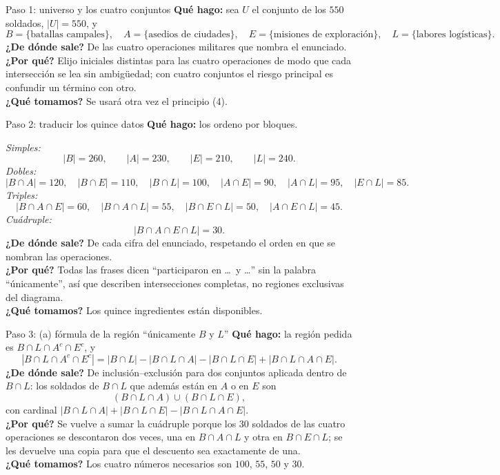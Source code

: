 \documentclass[11pt]{article}
\begin{document}
\begin{sol}

\begin{paso}{Paso 1: universo y los cuatro conjuntos}
\textbf{Qu\'e hago:} sea $U$ el conjunto de los $550$ soldados, $|U| = 550$, y
\[
B=\{\text{batallas campales}\},\quad
A=\{\text{asedios de ciudades}\},\quad
E=\{\text{misiones de exploraci\'on}\},\quad
L=\{\text{labores log\'isticas}\}.
\]
\textbf{¿De d\'onde sale?} De las cuatro operaciones militares que nombra el enunciado.\\
\textbf{¿Por qu\'e?} Elijo iniciales distintas para las cuatro operaciones de modo que cada intersecci\'on se lea sin ambig\"uedad; con cuatro conjuntos el riesgo principal es confundir un t\'ermino con otro.\\
\textbf{¿Qu\'e tomamos?} Se usar\'a otra vez el principio (4).
\end{paso}

\begin{paso}{Paso 2: traducir los quince datos}
\textbf{Qu\'e hago:} los ordeno por bloques.

\emph{Simples:}
\[
|B| = 260,\qquad |A| = 230,\qquad |E| = 210,\qquad |L| = 240 .
\]
\emph{Dobles:}
\[
|B\cap A| = 120,\quad |B\cap E| = 110,\quad |B\cap L| = 100,\quad |A\cap E| = 90,\quad |A\cap L| = 95,\quad |E\cap L| = 85 .
\]
\emph{Triples:}
\[
|B\cap A\cap E| = 60,\quad |B\cap A\cap L| = 55,\quad |B\cap E\cap L| = 50,\quad |A\cap E\cap L| = 45 .
\]
\emph{Cu\'adruple:}
\[
|B\cap A\cap E\cap L| = 30 .
\]
\textbf{¿De d\'onde sale?} De cada cifra del enunciado, respetando el orden en que se nombran las operaciones.\\
\textbf{¿Por qu\'e?} Todas las frases dicen ``participaron en \dots\ y \dots'' sin la palabra ``\'unicamente'', as\'i que describen intersecciones completas, no regiones exclusivas del diagrama.\\
\textbf{¿Qu\'e tomamos?} Los quince ingredientes est\'an disponibles.
\end{paso}

\begin{paso}{Paso 3: (a) f\'ormula de la regi\'on ``\'unicamente $B$ y $L$''}
\textbf{Qu\'e hago:} la regi\'on pedida es $B\cap L\cap A^{c}\cap E^{c}$, y
\[
|B\cap L\cap A^{c}\cap E^{c}| = |B\cap L| - |B\cap L\cap A| - |B\cap L\cap E| + |B\cap L\cap A\cap E| .
\]
\textbf{¿De d\'onde sale?} De inclusi\'on--exclusi\'on para dos conjuntos aplicada dentro de $B\cap L$: los soldados de $B\cap L$ que adem\'as est\'an en $A$ o en $E$ son
\[
(B\cap L\cap A)\cup(B\cap L\cap E),
\]
con cardinal $|B\cap L\cap A| + |B\cap L\cap E| - |B\cap L\cap A\cap E|$.\\
\textbf{¿Por qu\'e?} Se vuelve a sumar la cu\'adruple porque los $30$ soldados de las cuatro operaciones se descontaron dos veces, una en $B\cap A\cap L$ y otra en $B\cap E\cap L$; se les devuelve una copia para que el descuento sea exactamente de una.\\
\textbf{¿Qu\'e tomamos?} Los cuatro n\'umeros necesarios son $100$, $55$, $50$ y $30$.
\end{paso}


\end{sol}
\end{document}
